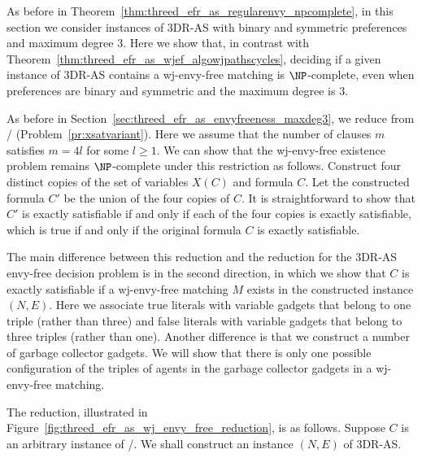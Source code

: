 As before in Theorem~\ref{thm:threed_efr_as_regularenvy_npcomplete}, in this section we consider instances of 3DR-AS with binary and symmetric preferences and maximum degree $3$. Here we show that, in contrast with Theorem~\ref{thm:threed_efr_as_wjef_algowjpathscycles}, deciding if a given instance of 3DR-AS contains a wj-envy-free matching is $\NP$-complete, even when preferences are binary and symmetric and the maximum degree is $3$.

As before in Section~\ref{sec:threed_efr_as_envyfreeness_maxdeg3}, we reduce from \porschenxsatvariant/ (Problem~\ref{pr:xsatvariant}). Here we assume that the number of clauses $m$ satisfies $m=4l$ for some $l\geq 1$. We can show that the wj-envy-free existence problem remains $\NP$-complete under this restriction as follows. Construct four distinct copies of the set of variables $X(C)$ and formula $C$. Let the constructed formula $C'$ be the union of the four copies of $C$. It is straightforward to show that $C'$ is exactly satisfiable if and only if each of the four copies is exactly satisfiable, which is true if and only if the original formula $C$ is exactly satisfiable.

The main difference between this reduction and the reduction for the 3DR-AS envy-free decision problem is in the second direction, in which we show that $C$ is exactly satisfiable if a wj-envy-free matching $M$ exists in the constructed instance $(N, E)$. Here we associate true literals with variable gadgets that belong to one triple (rather than three) and false literals with variable gadgets that belong to three triples (rather than one). Another difference is that we construct a number of garbage collector gadgets. We will show that there is only one possible configuration of the triples of agents in the garbage collector gadgets in a wj-envy-free matching.


The reduction, illustrated in Figure~\ref{fig:threed_efr_as_wj_envy_free_reduction}, is as follows. Suppose $C$ is an arbitrary instance of \porschenxsatvariant/. We shall construct an instance $(N, E)$ of 3DR-AS.

